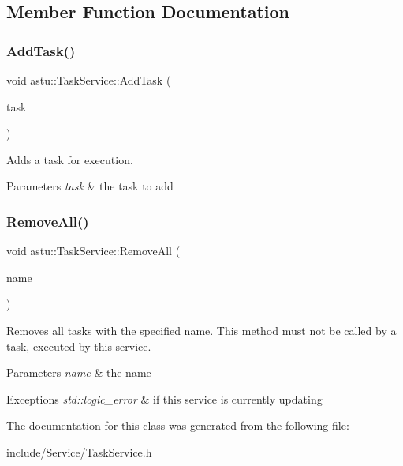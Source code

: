 \subsection{Member Function Documentation}
\mbox{\label{classastu_1_1TaskService_ac2458d90fef0ce197459247a6b720850}} 
\subsubsection{\texorpdfstring{Add\+Task()}{AddTask()}}
{\footnotesize\ttfamily void astu\+::\+Task\+Service\+::\+Add\+Task (\begin{DoxyParamCaption}\item[{std\+::unique\+\_\+ptr$<$ \hyperlink{classastu_1_1Task}{Task} $>$}]{task }\end{DoxyParamCaption})}

Adds a task for execution.


\begin{DoxyParams}{Parameters}
{\em task} & the task to add \\
\hline
\end{DoxyParams}
\mbox{\label{classastu_1_1TaskService_af86998c6284f9c682d0bbc1681b7592a}} 
\subsubsection{\texorpdfstring{Remove\+All()}{RemoveAll()}}
{\footnotesize\ttfamily void astu\+::\+Task\+Service\+::\+Remove\+All (\begin{DoxyParamCaption}\item[{const std\+::string \&}]{name }\end{DoxyParamCaption})}

Removes all tasks with the specified name. This method must not be called by a task, executed by this service.


\begin{DoxyParams}{Parameters}
{\em name} & the name \\
\hline
\end{DoxyParams}

\begin{DoxyExceptions}{Exceptions}
{\em std\+::logic\+\_\+error} & if this service is currently updating \\
\hline
\end{DoxyExceptions}


The documentation for this class was generated from the following file\+:\begin{DoxyCompactItemize}
\item 
include/\+Service/Task\+Service.\+h\end{DoxyCompactItemize}
